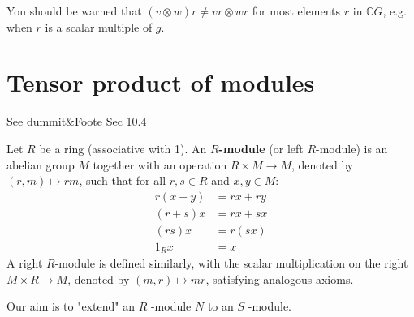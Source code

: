 \begin{remark}
You should be warned that $(v\otimes w)r\neq vr\otimes wr$ for most elements $r$ in $\mathbb{C}G$, e.g. when $r$ is a scalar multiple of $g$.
\end{remark}
\section{Tensor product of modules}

See dummit\&Foote Sec 10.4

\begin{definition}[$R$-module]
Let $R$ be a ring (associative with 1). An \textbf{$R$-module} (or left $R$-module) is an abelian group $M$ together with an operation $R \times M \to M$, denoted by $(r, m) \mapsto rm$, such that for all $r, s \in R$ and $x, y \in M$:
\[
\begin{aligned}
r(x+y) &= rx + ry \\
(r+s)x &= rx + sx \\
(rs)x &= r(sx) \\
1_R x &= x
\end{aligned}
\]A right $R$-module is defined similarly, with the scalar multiplication on the right $M \times R \to M$, denoted by $(m, r) \mapsto mr$, satisfying analogous axioms.
\end{definition}
Our aim is to "extend" an $R$ -module $N$ to an $S$ -module.

